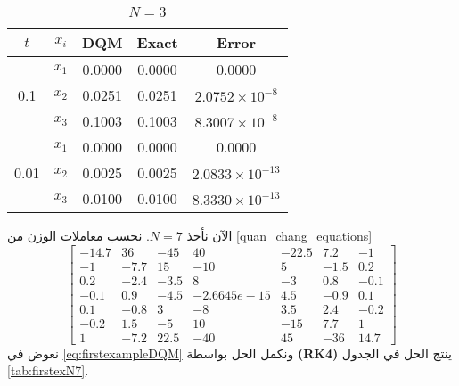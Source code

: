 \begin{solution}
\begin{table}[ht]
	\centering
	\begin{english}	
	\begin{tabular}{|c|c|c|c|c|}
		\hline
		$t$ & $x_i$ & DQM & Exact & Error \\
		\hline
		\multirow{3}{*}{0.1} & $x_1$ & 0.0000 & 0.0000 & 0.0000 \\
		& $x_2$ & 0.0251 & 0.0251 & $2.0752 \times 10^{-8}$ \\
		& $x_3$ & 0.1003 & 0.1003 & $8.3007 \times 10^{-8}$ \\
		\hline
		\multirow{3}{*}{0.01} & $x_1$ & 0.0000 & 0.0000 & 0.0000 \\
		& $x_2$ & 0.0025 & 0.0025 & $2.0833 \times 10^{-13}$ \\
		& $x_3$ & 0.0100 & 0.0100 & $8.3330 \times 10^{-13}$ \\
		\hline
	\end{tabular}
\end{english}
\caption{$N=3$}
\label{tab:firstexN3}
\end{table}


الآن نأخذ $N=7$. نحسب معاملات الوزن من \eqref{quan_chang_equations}  
\[
\begin{bmatrix}
	-14.7 & 36 & -45 & 40 & -22.5 & 7.2 & -1 \\
	-1 & -7.7 & 15 & -10 & 5 & -1.5 & 0.2 \\
	0.2 & -2.4 & -3.5 & 8 & -3 & 0.8 & -0.1 \\
	-0.1 & 0.9 & -4.5 & -2.6645e-15 & 4.5 & -0.9 & 0.1 \\
	0.1 & -0.8 & 3 & -8 & 3.5 & 2.4 & -0.2 \\
	-0.2 & 1.5 & -5 & 10 & -15 & 7.7 & 1 \\
	1 & -7.2 & 22.5 & -40 & 45 & -36 & 14.7
\end{bmatrix}
\]
نعوض في \eqref{eq:firstexampleDQM} ونكمل الحل بواسطة \textbf{(RK4)} ينتج الحل في الجدول \ref{tab:firstexN7}.


\end{solution}
